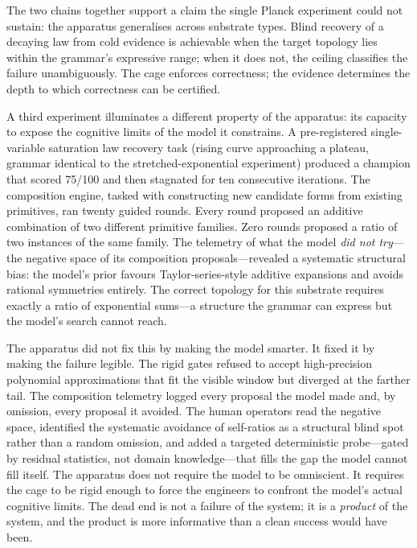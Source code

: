 \documentclass[11pt]{article}
\begin{document}
The two chains together support a claim the single Planck experiment could not sustain: the apparatus generalises across substrate types. Blind recovery of a decaying law from cold evidence is achievable when the target topology lies within the grammar's expressive range; when it does not, the ceiling classifies the failure unambiguously. The cage enforces correctness; the evidence determines the depth to which correctness can be certified.

A third experiment illuminates a different property of the apparatus: its capacity to expose the cognitive limits of the model it constrains. A pre-registered single-variable saturation law recovery task (rising curve approaching a plateau, grammar identical to the stretched-exponential experiment) produced a champion that scored 75/100 and then stagnated for ten consecutive iterations. The composition engine, tasked with constructing new candidate forms from existing primitives, ran twenty guided rounds. Every round proposed an additive combination of two different primitive families. Zero rounds proposed a ratio of two instances of the same family. The telemetry of what the model \emph{did not try}---the negative space of its composition proposals---revealed a systematic structural bias: the model's prior favours Taylor-series-style additive expansions and avoids rational symmetries entirely. The correct topology for this substrate requires exactly a ratio of exponential sums---a structure the grammar can express but the model's search cannot reach.

The apparatus did not fix this by making the model smarter. It fixed it by making the failure legible. The rigid gates refused to accept high-precision polynomial approximations that fit the visible window but diverged at the farther tail. The composition telemetry logged every proposal the model made and, by omission, every proposal it avoided. The human operators read the negative space, identified the systematic avoidance of self-ratios as a structural blind spot rather than a random omission, and added a targeted deterministic probe---gated by residual statistics, not domain knowledge---that fills the gap the model cannot fill itself. The apparatus does not require the model to be omniscient. It requires the cage to be rigid enough to force the engineers to confront the model's actual cognitive limits. The dead end is not a failure of the system; it is a \emph{product} of the system, and the product is more informative than a clean success would have been.
\end{document}
